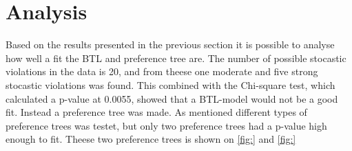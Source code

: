 \section*{Analysis}
\label{Analyse}
%
Based on the results presented in the previous section it is possible to analyse how well a fit the BTL and preference tree are.\blankline
%
The number of possible stocastic violations in the data is 20, and from theese one moderate and five strong stocastic violations was found. This combined with the Chi-square test, which calculated a p-value at 0.0055, showed that a BTL-model would not be a good fit. Instead a preference tree was made.\blankline
%
As mentioned different types of preference trees was testet, but only two preference trees had a p-value high enough to fit. Theese two preference trees is shown on \autoref{fig:} and \autoref{fig:}